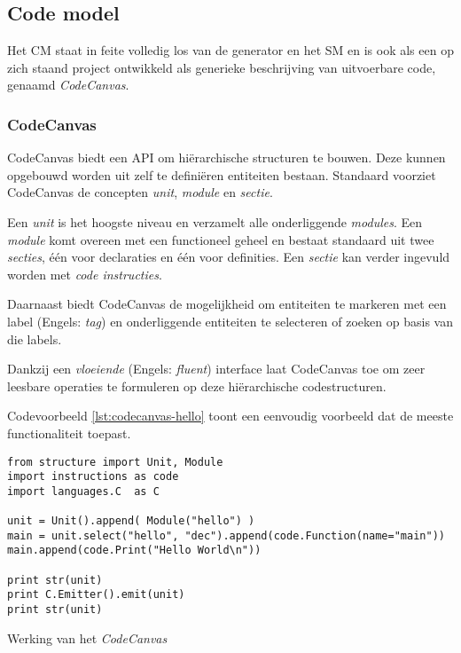 
\subsection{Code model}
\label{subsection:devel-code-model}

Het CM staat in feite volledig los van de generator en het SM en is ook als een
op zich staand project ontwikkeld als generieke beschrijving van uitvoerbare
code, genaamd \emph{CodeCanvas}.

\subsubsection{CodeCanvas}

CodeCanvas biedt een API om hi\"erarchische structuren te bouwen. Deze kunnen
opgebouwd worden uit zelf te defini\"eren entiteiten bestaan. Standaard
voorziet CodeCanvas de concepten \emph{unit}, \emph{module} en \emph{sectie}.

Een \emph{unit} is het hoogste niveau en verzamelt alle onderliggende
\emph{modules}. Een \emph{module} komt overeen met een functioneel geheel en
bestaat standaard uit twee \emph{secties}, \'e\'en voor declaraties en \'e\'en
voor definities. Een \emph{sectie} kan verder ingevuld worden met \emph{code
instructies}.

Daarnaast biedt CodeCanvas de mogelijkheid om entiteiten te markeren met een
label (Engels: \emph{tag}) en onderliggende entiteiten te selecteren of zoeken
op basis van die labels.

Dankzij een \emph{vloeiende} (Engels: \emph{fluent}) interface laat CodeCanvas
toe om zeer leesbare operaties te formuleren op deze hi\"erarchische
codestructuren.

Codevoorbeeld \ref{lst:codecanvas-hello} toont een eenvoudig voorbeeld dat de
meeste functionaliteit toepast. 

\begin{listing}[ht]
  \begin{verbatim}
from structure import Unit, Module
import instructions as code
import languages.C  as C

unit = Unit().append( Module("hello") )
main = unit.select("hello", "dec").append(code.Function(name="main"))
main.append(code.Print("Hello World\n"))

print str(unit)
print C.Emitter().emit(unit)
print str(unit)
  \end{verbatim}
  \vspace{-5mm}
  \caption{Werking van het \emph{CodeCanvas}}
  \label{lst:codecanvas-hello}
\end{listing}

